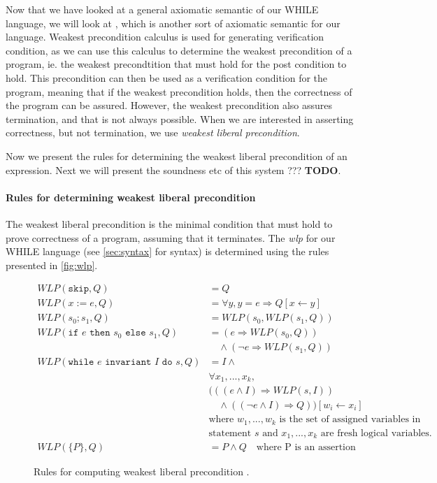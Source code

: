 Now that we have looked at a general axiomatic semantic of our WHILE language, we will look at , which is another sort of axiomatic semantic for our language.
Weakest precondition calculus is used for generating verification condition, as we can use this calculus to determine the weakest precondition of a program, ie. the weakest precondtition that must hold for the post condition to hold.
This precondition can then be used as a verification condition for the program, meaning that if the weakest precondition holds, then the correctness of the program can be assured. However, the weakest precondition also assures termination, and that is not always possible. When we are interested in asserting correctness, but not termination, we use \textit{weakest liberal precondition}.


Now we present the rules for determining the weakest liberal precondition of an expression.
Next we will present the soundness etc of this system ??? \textbf{TODO}.

\paragraph{Rules for determining weakest liberal precondition}
The weakest liberal precondition is the minimal condition that must hold to prove correctness of a program, assuming that it terminates.
The \textit{wlp} for our WHILE language (see \autoref{sec:syntax} for syntax) is determined using the rules presented in \autoref{fig:wlp}.

\begin{figure}
\begin{align*}
WLP(\texttt{skip}, Q) &= Q \\
WLP(x:=e,Q) &= \forall y, y = e \Rightarrow Q[x \leftarrow y] \\
WLP(s_0;s_1, Q) &= WLP(s_0, WLP(s_1, Q)) \\
WLP(\texttt{if } e \texttt{ then } s_0 \texttt{ else } s_1, Q) &= (e \Rightarrow WLP(s_0, Q)) \\
    &\quad \land (\neg e \Rightarrow WLP(s_1, Q)) \\
WLP(\texttt{while } e \texttt{ invariant } I \texttt{ do } s, Q) &=
    I \land \\
&\forall x_1, ..., x_k, \\
&(((e \land I) \Rightarrow WLP(s, I)) \\
&\quad \land (( \neg e \land I) \Rightarrow Q))
    [w_i \leftarrow x_i] \\
&\text{where } w_1, ..., w_k \text{ is the set of assigned variables in} \\
&\text{statement } s \text{ and } x_1, ..., x_k \text{ are fresh logical variables.} \\
WLP(\{P\}, Q) &= P \land Q \quad \text{where P is an assertion}
\end{align*}
\caption{Rules for computing weakest liberal precondition \cite{wlp}.}
\label{fig:wlp}
\end{figure}


